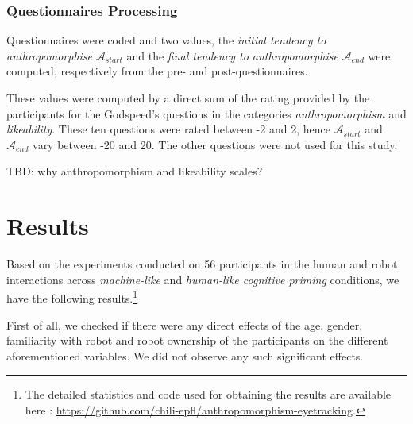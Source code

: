 \documentclass[lettersize, noapacite, twoside, HRI]{apa_HRI}
\newcommand{\ie}{\textit{i.e.}\xspace}
\newcommand{\anti}{{$\mathcal{A}_{start}$\xspace}}
\newcommand{\antf}{{$\mathcal{A}_{end}$\xspace}}
\begin{document}

\subsubsection{Questionnaires Processing}
\label{questionnaires_processing}

Questionnaires were coded and two values, the \emph{initial tendency to
anthropomorphise} \anti{} and the \emph{final tendency to anthropomorphise} \antf{}
were computed, respectively from the pre- and post-questionnaires.

These values were computed by a direct sum of the rating provided by the
participants for the Godspeed's questions in the categories
\emph{anthropomorphism} and \emph{likeability}. These ten questions were rated
between -2 and 2, hence \anti{} and \antf{} vary between -20 and 20. The other
questions were not used for this study.

TBD: why anthropomorphism and likeability scales?

\section{Results}

Based on the experiments conducted on 56 participants in the human and robot
interactions across \emph{machine-like} and \emph{human-like cognitive priming} conditions,
we have the following results.\footnote{The detailed statistics and code used
    for obtaining the results are available here :
\url{https://github.com/chili-epfl/anthropomorphism-eyetracking}.}

First of all, we checked if there were any direct effects of the age, gender,
familiarity with robot and robot ownership of the participants on the different
aforementioned variables. We did not observe any such significant effects. 


\end{document}
